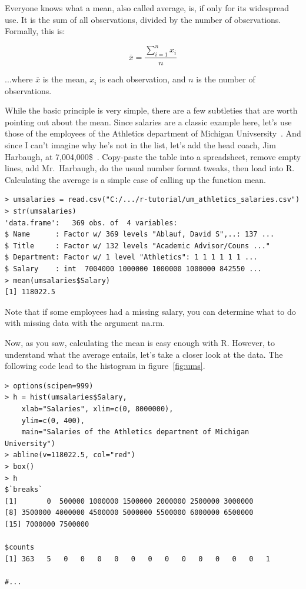 \documentclass{report}
\newcommand{\code}[1]{\textsf{\ttfamily #1}}
\begin{document}
		Everyone knows what a mean, also called average, is, if only for its widespread use. It is the sum of all observations, divided by the number of observations. Formally, this is:
		
		\[
			\overline{x} = \frac{\sum\limits_{i=1}^n x_{i}}{n}
		\]
		
		...where $\overline{x}$ is the mean, $x_i$ is each observation, and $n$ is the number of observations.
		
		While the basic principle is very simple, there are a few subtleties that are worth pointing out about the mean. Since salaries are a classic example here, let's use those of the employees of the Athletics department of Michigan Univsersity~\cite{ums}. And since I can't imagine why he's not in the list, let's add the head coach, Jim Harbaugh, at 7,004,000\$~\cite{jim}. Copy-paste the table into a spreadsheet, remove empty lines, add Mr.~Harbaugh, do the usual number format tweaks, then load into R. Calculating the average is a simple case of calling up the function \code{mean}.
		
		\begin{verbatim}
> umsalaries = read.csv("C:/.../r-tutorial/um_athletics_salaries.csv")
> str(umsalaries)
'data.frame':   369 obs. of  4 variables:
$ Name      : Factor w/ 369 levels "Ablauf, David S",..: 137 ...
$ Title     : Factor w/ 132 levels "Academic Advisor/Couns ..."
$ Department: Factor w/ 1 level "Athletics": 1 1 1 1 1 1 ...
$ Salary    : int  7004000 1000000 1000000 1000000 842550 ...
> mean(umsalaries$Salary)
[1] 118022.5
		\end{verbatim}
		
		Note that if some employees had a missing salary, you can determine what to do with missing data with the argument \code{na.rm}.
		
		Now, as you saw, calculating the mean is easy enough with R. However, to understand what the average entails, let's take a closer look at the data. The following code lead to the histogram in figure~\ref{fig:ums}.
		
		\begin{verbatim}
> options(scipen=999)
> h = hist(umsalaries$Salary, 
	xlab="Salaries", xlim=c(0, 8000000), 
	ylim=c(0, 400), 
	main="Salaries of the Athletics department of Michigan University")
> abline(v=118022.5, col="red")
> box()
> h
$`breaks`
[1]       0  500000 1000000 1500000 2000000 2500000 3000000
[8] 3500000 4000000 4500000 5000000 5500000 6000000 6500000
[15] 7000000 7500000

$counts
[1] 363   5   0   0   0   0   0   0   0   0   0   0   0   0   1

#...
\end{verbatim}
\end{document}
